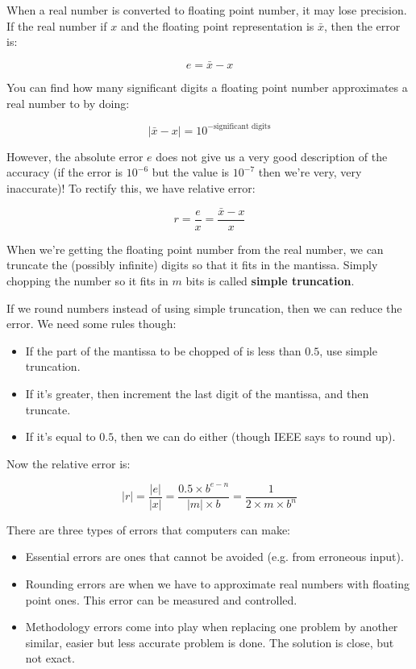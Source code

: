 
When a real number is converted to floating point number, it may lose precision.
If the real number if $x$ and the floating point representation is
$\bar{x}$, then the error is:

\[
  e = \bar{x} - x
\]

You can find how many significant digits a floating point number approximates a
real number to by doing:

\[
  |\bar{x} - x| = 10^{-\text{significant digits}}
\]


However, the absolute error $e$ does not give us a very good description of the
accuracy (if the error is $10^{-6}$ but the value is $10^{-7}$ then we're very,
very inaccurate)! To rectify this, we have relative error:

\[
  r = \frac{e}{x} = \frac{\bar{x} - x}{x}
\]


When we're getting the floating point number from the real number, we can
truncate the (possibly infinite) digits so that it fits in the mantissa. Simply
chopping the number so it fits in $m$ bits is called \textbf{simple truncation}.

If we round numbers instead of using simple truncation, then we can reduce the
error. We need some rules though:

\begin{itemize}
  \item If the part of the mantissa to be chopped of is less than $0.5$, use
  simple truncation.
  \item If it's greater, then increment the last digit of the mantissa, and then
  truncate.
  \item If it's equal to $0.5$, then we can do either (though IEEE says to round
  up).
\end{itemize}

Now the relative error is:

\[
  |r| = \frac{|e|}{|x|} = \frac{0.5 \times b^{e-n}}{|m|\times b}
      = \frac{1}{2 \times m \times b^n}
\]

There are three types of errors that computers can make:

\begin{itemize}
  \item Essential errors are ones that cannot be avoided (e.g. from erroneous
  input).
  \item Rounding errors are when we have to approximate real numbers with
  floating point ones. This error can be measured and controlled.
  \item Methodology errors come into play when replacing one problem by another
  similar, easier but less accurate problem is done. The solution is close, but
  not exact.
\end{itemize}

